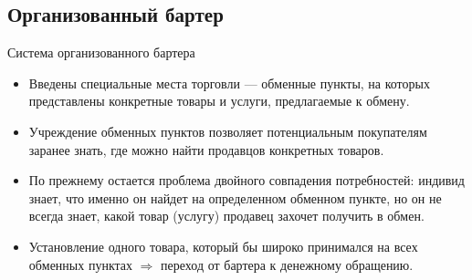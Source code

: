 \documentclass[_DKB_p1_Money.tex]{subfiles}
\begin{document}
\subsection{Организованный бартер}
\begin{frame}[shrink=10]{Система организованного бартера}
\begin{itemize}[<+->]
\item
Введены специальные места торговли — обменные пункты, на которых представлены конкретные товары и услуги, предлагаемые к обмену. 

\item
Учреждение обменных пунктов позволяет потенциальным покупателям заранее знать, где можно найти продавцов конкретных товаров. 

\item
По прежнему остается проблема двойного совпадения потребностей: индивид знает, что именно он найдет на определенном обменном пункте, но он не всегда знает, какой товар (услугу) продавец захочет получить в обмен.

\item
Установление одного товара, который бы широко принимался на всех обменных пунктах $\Rightarrow$ переход от бартера к денежному обращению.
\end{itemize}
\end{frame}
\end{document}
